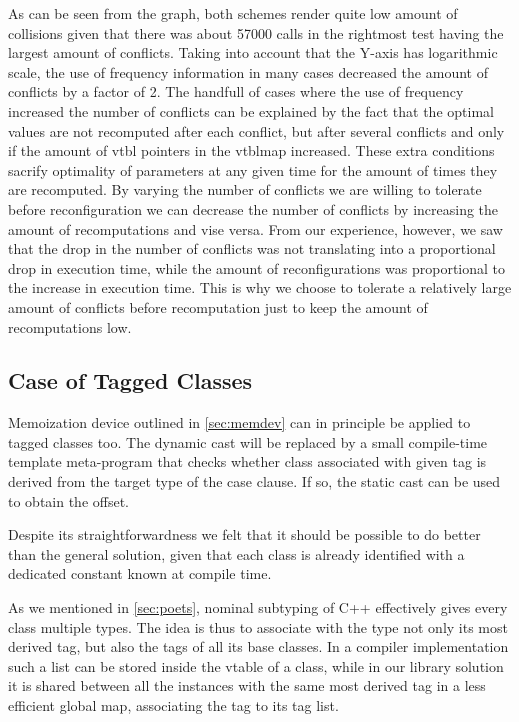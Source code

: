 \documentclass[preprint]{sigplanconf}
\begin{document}
As can be seen from the graph, both schemes render quite low amount of 
collisions given that there was about 57000 calls in the rightmost test having 
the largest amount of conflicts. Taking into account that the Y-axis has 
logarithmic scale, the use of frequency information in many cases decreased the 
amount of conflicts by a factor of 2. The handfull of cases where the use of 
frequency increased the number of conflicts can be explained by the fact that 
the optimal values are not recomputed after each conflict, but after several 
conflicts and only if the amount of vtbl pointers in the vtblmap increased. These 
extra conditions sacrify optimality of parameters at any given time for the amount 
of times they are recomputed. By varying the number of conflicts we are willing 
to tolerate before reconfiguration we can decrease the number of conflicts by 
increasing the amount of recomputations and vise versa. From our experience, 
however, we saw that the drop in the number of conflicts was not translating 
into a proportional drop in execution time, while the amount of reconfigurations 
was proportional to the increase in execution time. This is why we choose to 
tolerate a relatively large amount of conflicts before recomputation just to 
keep the amount of recomputations low.

\subsection{Case of Tagged Classes}
\label{sec:cotc}

Memoization device outlined in \textsection\ref{sec:memdev} can in principle be 
applied to tagged classes too. The dynamic cast will be replaced by a small 
compile-time template meta-program that checks whether class associated with 
given tag is derived from the target type of the case clause. If so, the static 
cast can be used to obtain the offset.

Despite its straightforwardness we felt that it should be possible to do better 
than the general solution, given that each class is already identified with a 
dedicated constant known at compile time.

As we mentioned in \textsection\ref{sec:poets}, nominal subtyping of C++ 
effectively gives every class multiple types. The idea is thus to associate with 
the type not only its most derived tag, but also the tags of all its base classes.
In a compiler implementation such a list can be stored inside the vtable of a 
class, while in our library solution it is shared between all the instances with 
the same most derived tag in a less efficient global map, associating the tag to 
its tag list.
\end{document}
